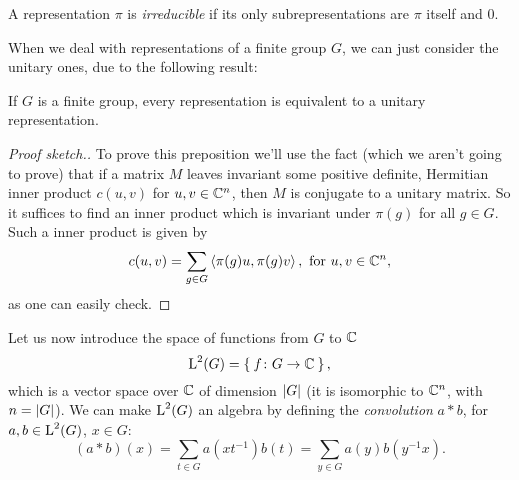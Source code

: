 \begin{defn}
A representation  $\pi$ is \emph{irreducible} if its only subrepresentations are $\pi$ itself and 0.
\end{defn}
When we deal with representations of a finite group $G$, we can just consider the unitary ones, due to the following result:
\begin{prop}
\label{unit:eqiv}
If $G$ is a finite group, every representation is equivalent to a unitary representation.
\end{prop}
\begin{proof}[Proof sketch.]
To prove this preposition we'll use the fact (which we aren't going to prove) that if a matrix $M$ leaves invariant some positive definite, Hermitian inner product $c(u,v)$ for $u,v \in {\mathbb C}^n$, then $M$ is conjugate to a unitary matrix.
So it suffices to find an inner product which is invariant under $\pi(g)$ for all $g \in G$. Such a inner product is given by 
\[
c(u,v)= \sum_{g \in G} \Braket{ \pi(g)u, \pi(g)v } , \text{ for } u,v \in {\mathbb C}^n,
\]
as one can easily check.
%

\end{proof}
Let us now introduce  the space of functions from $G$ to ${\mathbb C}$ 
\begin{equation*}
\operatorname{L}^2(G)=\Set{f\colon G \rightarrow {\mathbb C}},
\end{equation*}
which is a vector space over ${\mathbb C}$ of dimension $\lvert G\rvert$ (it is isomorphic to ${\mathbb C}^n$, with $n=\lvert G\rvert$).
We can make $\operatorname{L}^2(G)$ an algebra by defining the \emph{convolution} $a\ast b$, for $a,b\in \operatorname{L}^2(G)$, $x\in G$:
\begin{equation*}
(a\ast b)(x)=\sum_{t \in G} a(xt^{-1})b(t)=\sum_{y \in G} a(y)b(y^{-1}x).
\end{equation*}
